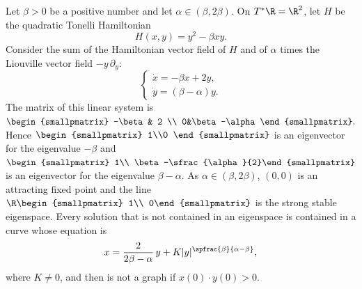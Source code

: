 Let $\beta>0$ be a positive number and let $\alpha\in(\beta, 2\beta)$. On $T^*\R=\R^2$, let $H$ be the quadratic Tonelli Hamiltonian
\[
H(x, y)=y^2-\beta xy.
\]
Consider the sum of the Hamiltonian vector field of $H$ and of $\alpha$ times the Liouville vector field $-y\, \partial_y$:
\begin{equation}\label{EPat1}
\begin{cases}
\dot x=-\beta x+2y,\\
\dot y=(\beta-\alpha) y.
\end{cases}
\end{equation}
The matrix of this linear system is $\begin{smallpmatrix} -\beta & 2 \\
0&\beta-\alpha
\end{smallpmatrix}.$ Hence $\begin{smallpmatrix} 1\\0
\end{smallpmatrix}$ is an eigenvector for the eigenvalue $-\beta$ and $\begin{smallpmatrix} 1\\ \beta-\sfrac{\alpha}{2}\end{smallpmatrix}$ is an eigenvector for the eigenvalue $\beta-\alpha$. As $\alpha\in(\beta, 2\beta)$, $(0,0)$ is an attracting fixed point and the line $\R\begin{smallpmatrix} 1\\ 0\end{smallpmatrix}$ is the strong stable eigenspace. Every solution that is not contained in an eigenspace is contained in a curve whose equation is
\[
x=\frac{2}{2\beta-\alpha}\,y+K\vert y\vert^{\spfrac{\beta}{\alpha-\beta}},
\]
where $K\not=0$, and then is not a graph if $x(0)\cdot y(0)>0$.

\begin{figure}[htb]
\end{figure}

